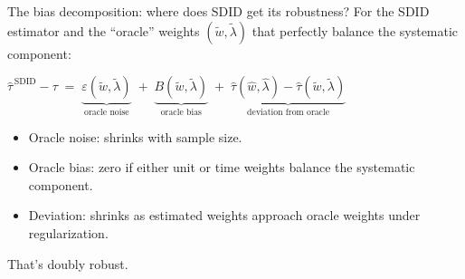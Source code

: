 \documentclass[aspectratio=169,11pt]{beamer}
\begin{document}

\begin{frame}{The bias decomposition: where does SDID get its robustness?}
\vspace{0.6em}
For the SDID estimator and the ``oracle'' weights $(\widetilde{w}, \widetilde{\lambda})$ that perfectly balance the systematic component:

\vspace{0.5em}
\begin{center}\small
$\widehat{\tau}^{\,\text{SDID}} - \tau \;=\; \underbrace{\varepsilon(\widetilde{w}, \widetilde{\lambda})}_{\text{oracle noise}} \;+\; \underbrace{B(\widetilde{w}, \widetilde{\lambda})}_{\text{oracle bias}} \;+\; \underbrace{\widehat{\tau}(\widehat{w}, \widehat{\lambda}) - \widehat{\tau}(\widetilde{w}, \widetilde{\lambda})}_{\text{deviation from oracle}}$
\end{center}

\vspace{0.7em}
\begin{itemize}\small
  \item Oracle noise: shrinks with sample size.
  \item Oracle bias: zero if either unit or time weights balance the systematic component.
  \item Deviation: shrinks as estimated weights approach oracle weights under regularization.
\end{itemize}

\vspace{0.5em}
 \;That's doubly robust.
\end{frame}
\end{document}
